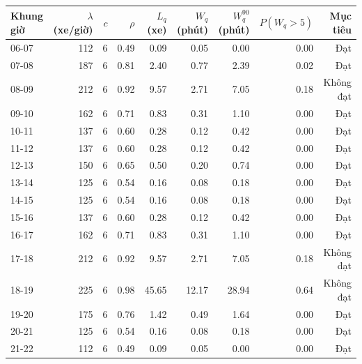 \begin{tabular}{lrrrrrrrr}
\toprule
\textbf{Khung giờ} & \textbf{$\lambda$ (xe/giờ)} & \textbf{$c$} & \textbf{$\rho$} & \textbf{$L_q$ (xe)} & \textbf{$W_q$ (phút)} & \textbf{$W_q^{90}$ (phút)} & \textbf{$P(W_q{>}5)$} & \textbf{Mục tiêu} \\
\midrule
06-07 & 112 & 6 & 0.49 & 0.09 & 0.05 & 0.00 & 0.00 & Đạt \\
07-08 & 187 & 6 & 0.81 & 2.40 & 0.77 & 2.39 & 0.02 & Đạt \\
08-09 & 212 & 6 & 0.92 & 9.57 & 2.71 & 7.05 & 0.18 & Không đạt \\
09-10 & 162 & 6 & 0.71 & 0.83 & 0.31 & 1.10 & 0.00 & Đạt \\
10-11 & 137 & 6 & 0.60 & 0.28 & 0.12 & 0.42 & 0.00 & Đạt \\
11-12 & 137 & 6 & 0.60 & 0.28 & 0.12 & 0.42 & 0.00 & Đạt \\
12-13 & 150 & 6 & 0.65 & 0.50 & 0.20 & 0.74 & 0.00 & Đạt \\
13-14 & 125 & 6 & 0.54 & 0.16 & 0.08 & 0.18 & 0.00 & Đạt \\
14-15 & 125 & 6 & 0.54 & 0.16 & 0.08 & 0.18 & 0.00 & Đạt \\
15-16 & 137 & 6 & 0.60 & 0.28 & 0.12 & 0.42 & 0.00 & Đạt \\
16-17 & 162 & 6 & 0.71 & 0.83 & 0.31 & 1.10 & 0.00 & Đạt \\
17-18 & 212 & 6 & 0.92 & 9.57 & 2.71 & 7.05 & 0.18 & Không đạt \\
18-19 & 225 & 6 & 0.98 & 45.65 & 12.17 & 28.94 & 0.64 & Không đạt \\
19-20 & 175 & 6 & 0.76 & 1.42 & 0.49 & 1.64 & 0.00 & Đạt \\
20-21 & 125 & 6 & 0.54 & 0.16 & 0.08 & 0.18 & 0.00 & Đạt \\
21-22 & 112 & 6 & 0.49 & 0.09 & 0.05 & 0.00 & 0.00 & Đạt \\
\bottomrule
\end{tabular}
